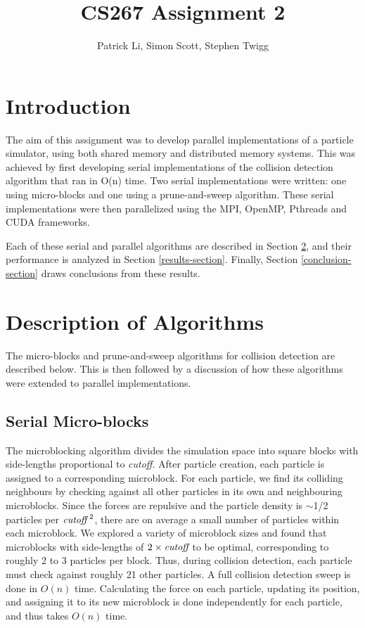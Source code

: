 \documentclass[11pt]{article} %
\title{CS267 Assignment 2}
\author{Patrick Li, Simon Scott, Stephen Twigg}
\begin{document}
\maketitle
\parskip 7.2pt

\section{Introduction}

The aim of this assignment was to develop parallel implementations of a particle simulator, using both shared memory and distributed memory systems. This was achieved by first developing serial implementations of the collision detection algorithm that ran in O(n) time. Two serial implementations were written: one using micro-blocks and one using a prune-and-sweep algorithm. These serial implementations were then parallelized using the MPI, OpenMP, Pthreads and CUDA frameworks.

Each of these serial and parallel algorithms are described in Section \ref{algorithm-section}, and their performance is analyzed in Section \ref{results-section}. Finally, Section \ref{conclusion-section} draws conclusions from these results.




\section{Description of Algorithms}
\label{algorithm-section}

The micro-blocks and prune-and-sweep algorithms for collision detection are described below. This is then followed by a discussion of how these algorithms were extended to parallel implementations.

\subsection{Serial Micro-blocks}

The microblocking algorithm divides the simulation space into square blocks with side-lengths proportional to {\em cutoff}. After particle creation, each particle is assigned to a corresponding microblock. For each particle, we find its colliding neighbours by checking against all other particles in its own and neighbouring microblocks. Since the forces are repulsive and the particle density is $\sim$1/2 particles per $\text{\em cutoff}^\text{~2}$, there are on average a small number of particles within each microblock. We explored a variety of microblock sizes and found that microblocks with side-lengths of $2\times\text{\em cutoff}$ to be optimal, corresponding to roughly 2 to 3 particles per block. Thus, during collision detection, each particle must check against roughly 21 other particles. A full collision detection sweep is done in $O(n)$ time. Calculating the force on each particle, updating its position, and assigning it to its new microblock is done independently for each particle, and thus takes $O(n)$ time.
\end{document}
